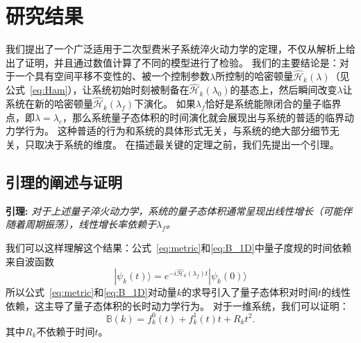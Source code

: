 	\section{研究结果}
	
		我们提出了一个广泛适用于二次型费米子系统淬火动力学的定理，不仅从解析上给出了证明，并且通过数值计算了不同的模型进行了检验。
		我们的主要结论是：对于一个具有空间平移不变性的、被一个控制参数$\lambda$所控制的哈密顿量$\hat{\mathcal{H}}_k(\lambda)$（见公式~\eqref{eq:Ham}），让系统初始时刻被制备在$\hat{\mathcal{H}}_k(\lambda_0)$的基态上，然后瞬间改变$\lambda$让系统在新的哈密顿量$\hat{\mathcal{H}}_k(\lambda_f)$下演化。
		如果$\lambda_f$恰好是系统能隙闭合的量子临界点，即$\lambda=\lambda_c$，那么系统量子态体积的时间演化就会展现出与系统的普适的临界动力学行为。
		这种普适的行为和系统的具体形式无关，与系统的绝大部分细节无关，只取决于系统的维度。
		在描述最关键的定理之前，我们先提出一个引理。
		
		\subsection{引理的阐述与证明}	
			{\bf 引理:}
			\textit{对于上述量子淬火动力学，系统的量子态体积通常呈现出线性增长（可能伴随着周期振荡），线性增长率依赖于$\lambda_f$。}
			
			我们可以这样理解这个结果：公式~\eqref{eq:metric}和\eqref{eq:B_1D}中量子度规的时间依赖来自波函数
			\begin{equation}\label{eq:phit}
				|\psi_k(t)\rangle=e^{-i\hat{\mathcal{H}}_k(\lambda_f)t}|\psi_k(0)\rangle
			\end{equation}
			所以公式~\eqref{eq:metric}和\eqref{eq:B_1D}对动量$k$的求导引入了量子态体积对时间$t$的线性依赖，这主导了量子态体积的长时动力学行为。		
			对于一维系统，我们可以证明：
			\begin{equation}\label{eq:Rk_1D}
				\mathbb{B}(k) = f_k^0(t)+f_k^1(t) t+R_k t^2. 
			\end{equation}
			其中$R_k$不依赖于时间$t$。
			

